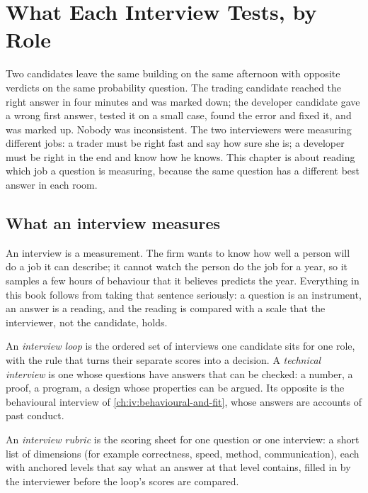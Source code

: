 \chapter{What Each Interview Tests, by Role}\label{ch:iv:what-each-interview-tests-by-role}

Two candidates leave the same building on the same afternoon with opposite verdicts on the same probability
question. The trading candidate reached the right answer in four minutes and was marked down; the developer
candidate gave a wrong first answer, tested it on a small case, found the error and fixed it, and was marked
up. Nobody was inconsistent. The two interviewers were measuring different jobs: a trader must be right fast
and say how sure she is; a developer must be right in the end and know how he knows. This chapter is about
reading which job a question is measuring, because the same question has a different best answer in each
room.

\section{What an interview measures}

An interview is a measurement. The firm wants to know how well a person will do a job it can describe; it
cannot watch the person do the job for a year, so it samples a few hours of behaviour that it believes
predicts the year. Everything in this book follows from taking that sentence seriously: a question is an
instrument, an answer is a reading, and the reading is compared with a scale that the interviewer, not the
candidate, holds.

\begin{definition}\label{def:iv:what-each-interview-tests-by-role:loop}
An \emph{interview loop} is the ordered set of interviews one candidate sits for one
role, with the rule that turns their separate scores into a decision. A \emph{technical
interview} is one whose questions have answers that can be checked: a number, a
proof, a program, a design whose properties can be argued. Its opposite is the behavioural interview of
\cref{ch:iv:behavioural-and-fit}, whose answers are accounts of past conduct.
\end{definition}

\begin{definition}\label{def:iv:what-each-interview-tests-by-role:rubric}
An \emph{interview rubric} is the scoring sheet for one question or one interview: a
short list of dimensions (for example correctness, speed, method, communication), each with anchored levels
that say what an answer at that level contains, filled in by the interviewer before the loop's scores are
compared.
\end{definition}

